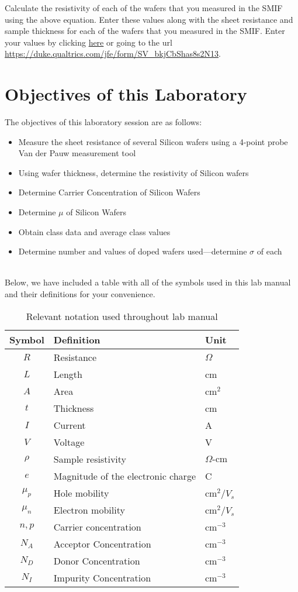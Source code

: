 \documentclass[12pt]{../manual}
\begin{document}
Calculate the resistivity of each of the wafers that you measured in the SMIF using the above equation.  Enter these values along with the sheet resistance and sample thickness for each of the wafers that you measured in the SMIF.  Enter your values by clicking \href{https://duke.qualtrics.com/jfe/form/SV_bkjCbShas8s2N13}{here} or going to the url \url{https://duke.qualtrics.com/jfe/form/SV_bkjCbShas8s2N13}.

\newpage
\section{Objectives of this Laboratory}
The objectives of this laboratory session are as follows:
\begin{itemize}
\item Measure the sheet resistance of several Silicon wafers using a 4-point probe Van der Pauw measurement tool
\item Using wafer thickness, determine the resistivity of Silicon wafers
\item Determine Carrier Concentration of Silicon Wafers
\item Determine $\mu$ of Silicon Wafers
\item Obtain class data and average class values
\item Determine number and values of doped wafers used---determine $\sigma$ of each
\end{itemize}
~\\ Below, we have included a table with all of the symbols used in this lab manual and their definitions for your convenience.
\def\arraystretch{1.5}
\begin{table}[ht!]
\caption{Relevant notation used throughout lab manual}
\centering
\begin{tabular}{|c|l|l|} \hline
Symbol 	& Definition							& Unit		\\ \hline
$R$ 	& Resistance 							& $\Omega$	\\ \hline
$L$		& Length								& cm		\\ \hline
$A$		& Area									& cm$^2$	\\ \hline
$t$		& Thickness								& cm		\\ \hline
$I$		& Current								& A			\\ \hline
$V$		& Voltage								& V			\\ \hline	
$\rho$ 	& Sample resistivity 					& $\Omega \mbox{-cm}$ \\ \hline
$e$ 	& Magnitude of the electronic charge 	& C 		\\ \hline
$\mu_p$ & Hole mobility 						& cm$^2 / V_s$ \\ \hline
$\mu_n$ & Electron mobility 					& cm$^2 / V_s$ \\ \hline
$n,p$ 	& Carrier concentration 				& cm$^{-3}$	\\ \hline
$N_A$	& Acceptor Concentration 				& cm$^{-3}$	\\ \hline
$N_D$ 	& Donor Concentration 					& cm$^{-3}$	\\ \hline
$N_I$	& Impurity Concentration 				& cm$^{-3}$	\\ \hline
\end{tabular}
\end{table}
\end{document}
